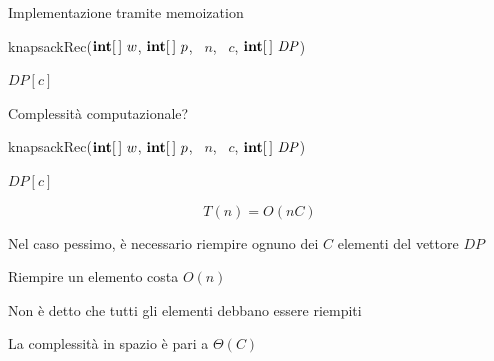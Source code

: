\begin{frame}{Implementazione tramite memoization}

\vspace{-9pt}
\begin{Procedure}
\caption[A]{\textsf{knapsackRec}($\INTEGER[\,]\ w$, $\INTEGER[\,]\ p$, \INTEGER\ $n$, \INTEGER\ $c$, $\INTEGER[\,]\ \mathit{DP}$)}
\Return $\mathit{DP}[c]$\;
\end{Procedure}
\end{frame}

\begin{frame}{Complessità computazionale?}

\vspace{-6pt}

\begin{overprint}
\begingroup
\footnotesize
\begin{Procedure}
\caption[A]{\textsf{knapsackRec}($\INTEGER[\,]\ w$, $\INTEGER[\,]\ p$, \INTEGER\ $n$, \INTEGER\ $c$, $\INTEGER[\,]\ \mathit{DP}$)}
\Return $\mathit{DP}[c]$\;
\end{Procedure}
\endgroup
{}

\[ 
  T(n) = O(nC)
\]

\BIL
\item Nel caso pessimo, è necessario riempire ognuno dei $C$ elementi del vettore $\mathit{DP}$
\item Riempire un elemento costa $O(n)$
\EIL

\BIL
\item Non è detto che tutti gli elementi debbano essere riempiti
\item La complessità in spazio è pari a $\Theta(C)$
\EIL
\end{overprint}

\end{frame}


